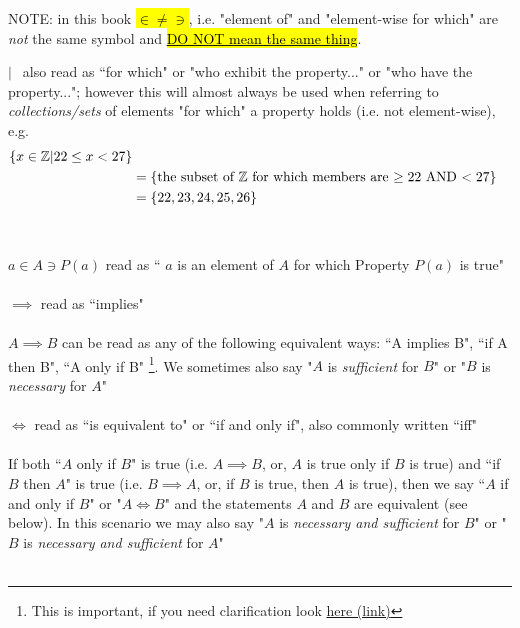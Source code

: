 \begin{tcolorbox}
\begin{center}
NOTE: in this book \hl{$\in \neq \ni $}, i.e. "element of" and "element-wise for which" are \textit{not} the same symbol and  \underline{\hl{DO NOT mean the same thing}}.
\end{center}
\end{tcolorbox}
$| \ \ $ also read as ``for which" or "who exhibit the property..." or "who have the property..."; however this will almost always be used when referring to \textit{collections/sets} of elements "for which" a property holds (i.e. not element-wise), e.g. 
\begin{align}
    \{x\in {\mathbb{ Z}} | 22\leq x < 27\}  \nonumber \\
    &= \{ \text{the subset of ${\mathbb{ Z}}$ for which members are $\geq 22$ AND $<27$} \} \nonumber \\
    &= \{22,23,24,25,26\}\nonumber
\end{align}
  \\ \\%
$a\in A \ni P(a)$ read as `` $a$ is an element of $A$ for which Property $P(a)$ is true"\\ \\
$\implies$ read as ``implies"\\ \\
$A\implies B$ can be read as any of the following equivalent ways: ``A implies B", ``if A then B", ``A only if B" \footnote{This is important, if you need clarification look \href{https://criticalthinkeracademy.com/courses/propositional-logic/lectures/51574}{here (link)}}. We sometimes also say "$A$ is \textit{sufficient} for $B$" or "$B$ is \textit{necessary} for $A$"\\ \\ 
$\Leftrightarrow$ read as ``is equivalent to" or ``if and only if", also commonly written ``iff"\\ \\
If both ``$A$ only if $B$" is true (i.e. $A\implies B$, or, $A$ is true only if $B$ is true) and ``if $B$ then $A$" is true (i.e. $B\implies A$, or, if $B$ is true, then $A$ is true), then we say ``$A$ if and only if $B$" or "$A\iff B$" and the statements $A$ and $B$ are equivalent (see below). In this scenario we may also say "$A$ is \textit{necessary and sufficient} for $B$" or "$B$ is \textit{necessary and sufficient} for $A$" \\ \\
